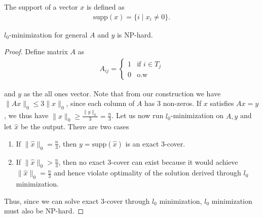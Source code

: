 \begin{definition}
The support of a vector $x$ is defined as
\begin{align*}
\text{supp}(x) = \{i \mid x_i \neq 0 \}.
\end{align*}
\end{definition}

\begin{theorem}
$l_0$-minimization for general $A$ and $y$ is NP-hard.
\end{theorem}
\begin{proof}
Define matrix $A$ as
\begin{align*}
    A_{ij} = \begin{cases}
    1 & \text{if } i \in T_j \\
    0 & \text{o.w}
    \end{cases}
\end{align*}

and $y$ as the all ones vector. Note that from our construction we have $\|Ax\|_0 \leq 3\|x\|_0$, since each column of $A$ has 3 non-zeros. If $x$ satisfies $Ax = y$, we thus have $\|x\|_0 \geq \frac{\|y\|_0}{3} = \frac{n}{3}$. Let us now run $l_0$-minimization on $A, y$ and let $\hat{x}$ be the output. There are two cases

\begin{enumerate}
    \item If $\|\hat{x}\|_0 = \frac{n}{3}$, then $y = \text{supp}(\hat{x})$ is an exact 3-cover. %
    \item If $\| \hat{x}\|_0 > \frac{n}{3}$, then no exact 3-cover can exist because it would achieve $\|\hat{x}\|_0 = \frac{n}{3}$ and hence violate optimality of the solution derived through $l_0$ minimization.
\end{enumerate}

Thus, since we can solve exact 3-cover through $l_0$ minimization, $l_0$ minimization must also be NP-hard.
\end{proof}

